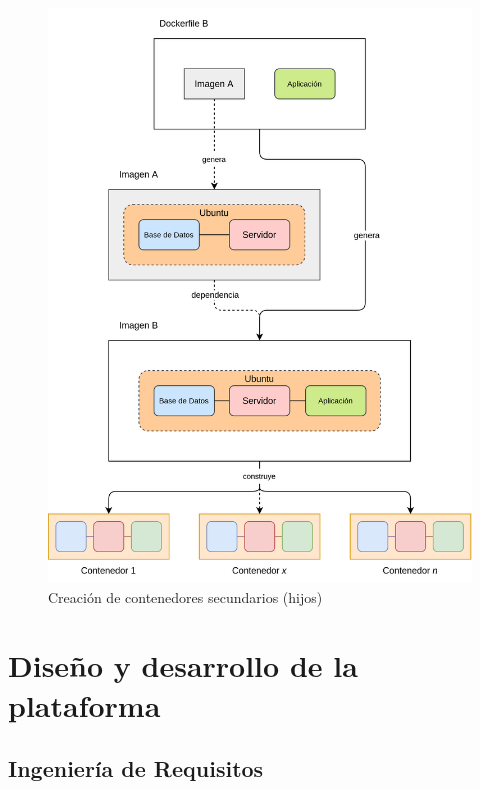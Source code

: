                 \begin{figure}[!htbp]
                    \centering
                    \includegraphics[scale=0.14]{images/Diagramas/Contenedor B.png}
                    \caption{Creación de contenedores secundarios (hijos)}
                    \label{fig:contenedor-hijo}
                \end{figure}
                
                \cleardoublepage



\chapter{Diseño y desarrollo de la plataforma}
    
    \section{Ingeniería de Requisitos}
        \label{cap:ingenieria-requisitos}
        
